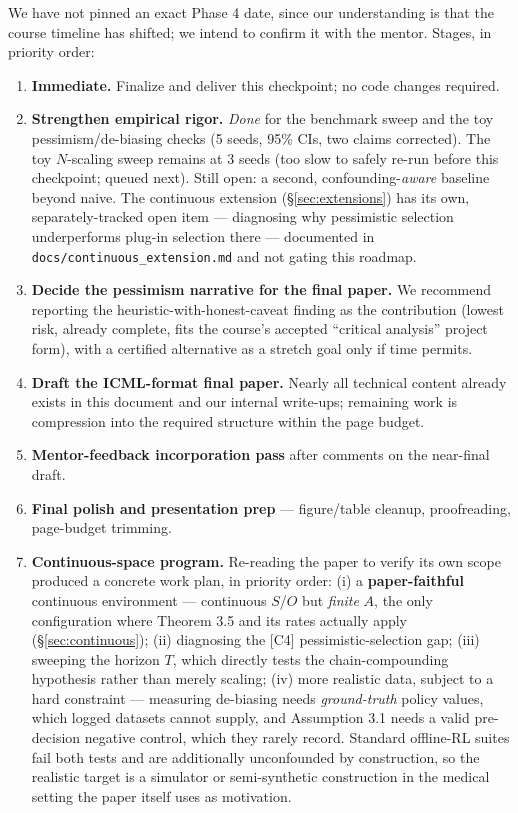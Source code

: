 \documentclass[11pt]{article}
\begin{document}
We have not pinned an exact Phase 4 date, since our understanding is that the course
timeline has shifted; we intend to confirm it with the mentor. Stages, in priority order:

\begin{enumerate}[label=\textbf{\Alph*.}]
  \item \textbf{Immediate.} Finalize and deliver this checkpoint; no code changes required.
  \item \textbf{Strengthen empirical rigor.} \emph{Done} for the benchmark sweep
  and the toy pessimism/de-biasing checks (5 seeds, 95\% CIs, two claims corrected). The
  toy $N$-scaling sweep remains at 3 seeds (too slow to safely re-run before this checkpoint;
  queued next). Still open: a second, confounding-\emph{aware} baseline beyond naive. The
  continuous extension (\S\ref{sec:extensions}) has its own, separately-tracked open item
  --- diagnosing why pessimistic selection underperforms plug-in selection there ---
  documented in \texttt{docs/continuous\_extension.md} and not gating this roadmap.
  \item \textbf{Decide the pessimism narrative for the final paper.} We recommend
  reporting the heuristic-with-honest-caveat finding as the contribution (lowest risk,
  already complete, fits the course's accepted ``critical analysis'' project form), with a
  certified alternative as a stretch goal only if time permits.
  \item \textbf{Draft the ICML-format final paper.} Nearly all technical content already
  exists in this document and our internal write-ups; remaining work is compression into
  the required structure within the page budget.
  \item \textbf{Mentor-feedback incorporation pass} after comments on the near-final draft.
  \item \textbf{Final polish and presentation prep} --- figure/table cleanup, proofreading,
  page-budget trimming.
  \item \textbf{Continuous-space program.} Re-reading the paper to verify its own scope
  produced a concrete work plan, in priority order: (i) a \textbf{paper-faithful}
  continuous environment --- continuous $S$/$O$ but \emph{finite} $A$, the only
  configuration where Theorem 3.5 and its rates actually apply (\S\ref{sec:continuous});
  (ii) diagnosing the [C4] pessimistic-selection gap; (iii) sweeping the horizon $T$,
  which directly tests the chain-compounding hypothesis rather than merely scaling;
  (iv) more realistic data, subject to a hard constraint --- measuring de-biasing needs
  \emph{ground-truth} policy values, which logged datasets cannot supply, and Assumption
  3.1 needs a valid pre-decision negative control, which they rarely record. Standard
  offline-RL suites fail both tests and are additionally unconfounded by construction, so
  the realistic target is a simulator or semi-synthetic construction in the medical
  setting the paper itself uses as motivation.
\end{enumerate}
\end{document}
